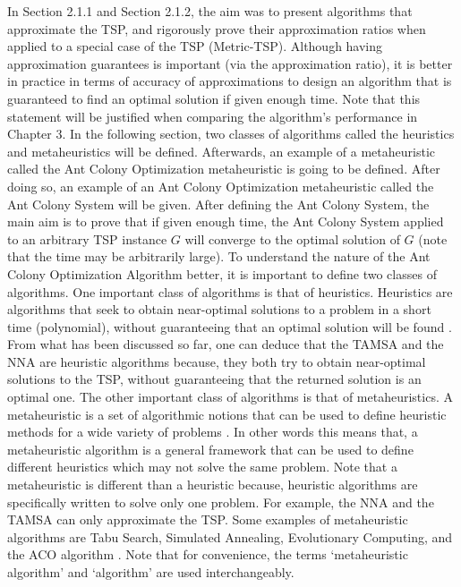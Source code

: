 \documentclass[12pt]{article}
\numberwithin{equation}{subsection}
\numberwithin{table}{subsection}
\numberwithin{algorithm}{subsection}
\numberwithin{figure}{subsection}
\begin{document}
In Section 2.1.1 and Section 2.1.2, the aim was to present algorithms that approximate the TSP, and rigorously prove their approximation ratios when applied to a special case of the TSP (Metric-TSP). Although having approximation guarantees is important (via the approximation ratio), it is better in practice in terms of accuracy of approximations to design an algorithm that is guaranteed to find an optimal solution if given enough time. Note that this statement will be justified when comparing the algorithm's performance in Chapter 3. In the following section, two classes of algorithms called the heuristics and metaheuristics will be defined. Afterwards, an example of a metaheuristic called the Ant Colony Optimization metaheuristic is going to be defined. After doing so, an example of an Ant Colony Optimization metaheuristic called the Ant Colony System will be given. After defining the Ant Colony System, the main aim is to prove that if given enough time, the Ant Colony System applied to an arbitrary TSP instance $G$ will converge to the optimal solution of $G$ (note that the time may be arbitrarily large).
{}
\label{section_ACO}
To understand the nature of the Ant Colony Optimization Algorithm better, it is important to define two classes of algorithms. One important class of algorithms is that of heuristics. Heuristics are algorithms that seek to obtain near-optimal solutions to a problem in a short time (polynomial), without guaranteeing that an optimal solution will be found \cite{dorigo_stutzle_thomas_2004}. From what has been discussed so far, one can deduce that the TAMSA and the NNA are heuristic algorithms because, they both try to obtain near-optimal solutions to the TSP, without guaranteeing that the returned solution is an optimal one. The other important class of algorithms is that of metaheuristics.  A metaheuristic is a set of algorithmic notions that can be used to define heuristic methods for a wide variety of problems \cite{dorigo_stutzle_thomas_2004}. In other words this means that, a metaheuristic algorithm is a general framework that can be used to define different heuristics which may not solve the same problem. Note that a metaheuristic is different than a heuristic because, heuristic algorithms are specifically written to solve only one problem. For example, the NNA and the TAMSA can only approximate the TSP. Some examples of metaheuristic algorithms are Tabu Search, Simulated Annealing, Evolutionary Computing, and the ACO algorithm \cite{dorigo_stutzle_thomas_2004}. Note that for convenience, the terms `metaheuristic algorithm' and `algorithm' are used interchangeably.\\\\
\end{document}
